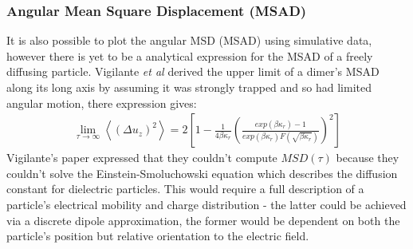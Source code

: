 \documentclass[a4paper,oneside,11pt]{book}
\begin{document}
\subsubsection{Angular Mean Square Displacement (MSAD)}
It is also possible to plot the angular MSD (MSAD) using simulative data, however there is yet to be a analytical expression for the MSAD of a freely diffusing particle. Vigilante \textit{et al} \cite{Vigilante2020} derived the upper limit of a dimer's MSAD along its long axis by assuming it was strongly trapped and so had limited angular motion, there expression gives:
\begin{align}
	\lim_{\tau\to\infty}\left<(\Delta u_z)^2\right> = 
	2\left[1-\frac{1}{4\beta\kappa_r} 
	\left(\frac{exp(\beta\kappa_r)-1}
	{exp(\beta\kappa_r)F(\sqrt{\beta\kappa_r})
	}\right)^2\right]
\end{align}  
Vigilante's paper expressed that they couldn't compute $MSD(\tau)$ because they couldn't solve the Einstein-Smoluchowski equation which describes the diffusion constant for dielectric particles. This would require a full description of a particle's electrical mobility and charge distribution - the latter could be achieved via a discrete dipole approximation, the former would be dependent on both the particle's position but relative orientation to the electric field.
\end{document}
